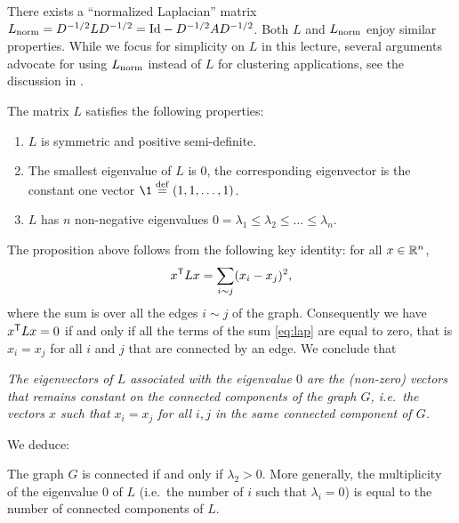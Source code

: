 \documentclass[11pt,nocut]{article}
\begin{document}
\begin{remark}
	There exists a ``normalized Laplacian'' matrix $L_{\rm norm} = D^{-1/2} L D^{-1/2} = {{\rm Id}} - D^{-1/2} A D^{-1/2}$. Both $L$ and $L_{\rm norm}$ enjoy similar properties.
	While we focus for simplicity on $L$ in this lecture, several arguments advocate for using $L_{\rm norm}$ instead of $L$ for clustering applications, see the discussion in \cite[Section~8.4]{von2007tutorial}.
\end{remark}

\begin{proposition}
	The matrix $L$ satisfies the following properties:
	\begin{enumerate}
		\item $L$ is symmetric and positive semi-definite.
		\item The smallest eigenvalue of $L$ is $0$, the corresponding eigenvector is the constant one vector $\1 \defeq (1,1, \dots, 1)$.
		\item $L$ has $n$ non-negative eigenvalues $0 = \lambda_1 \leq \lambda_2 \leq \dots \leq \lambda_n$.
	\end{enumerate}
\end{proposition}

The proposition above follows from the following key identity: for all $x \in \mathbb{R}^n$,
\begin{equation}\label{eq:lap}
x^{{\sf T}} L x = \sum_{i \sim j} (x_i - x_j)^2,
\end{equation}
where the sum is over all the edges $i \sim j$ of the graph.
Consequently we have $x^{{\sf T}} L x = 0$ if and only if all the terms of the sum \eqref{eq:lap} are equal to zero, that is $x_i = x_j$ for all $i$ and $j$ that are connected by an edge. We conclude that
\begin{center}
	\emph{
	The eigenvectors of $L$ associated with the eigenvalue $0$ are the (non-zero) vectors that remains constant on the connected components of the graph $G$, i.e.\ the vectors $x$ such that $x_i = x_j$ for all $i,j$ in the same connected component of $G$.}
\end{center}

We deduce:
\begin{proposition}\label{prop:lambda2}
	The graph $G$ is connected if and only if $\lambda_2 > 0$.
More generally, the multiplicity of the eigenvalue $0$ of $L$ (i.e.\ the number of $i$ such that $\lambda_i = 0$) is equal to the number of connected components of $L$.
\end{proposition}
\end{document}
